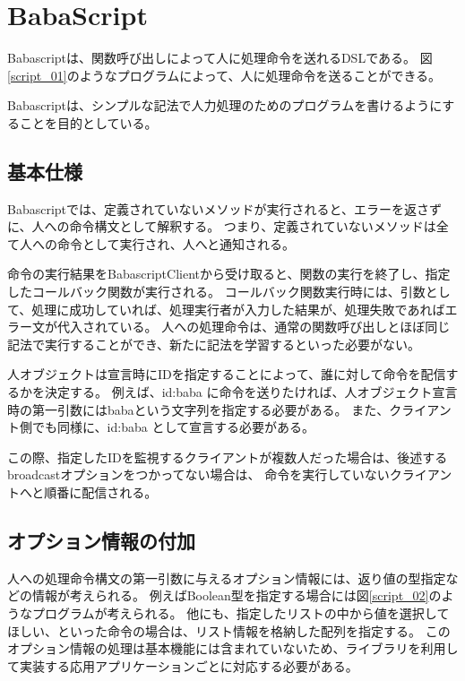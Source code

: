 \documentclass[twoside]{wiss}
\begin{document}
\section{BabaScript}

Babascriptは、関数呼び出しによって人に処理命令を送れるDSLである。
図\ref{script_01}のようなプログラムによって、人に処理命令を送ることができる。

Babascriptは、シンプルな記法で人力処理のためのプログラムを書けるようにすることを目的としている。

\subsection{基本仕様}

Babascriptでは、定義されていないメソッドが実行されると、エラーを返さずに、人への命令構文として解釈する。
つまり、定義されていないメソッドは全て人への命令として実行され、人へと通知される。

命令の実行結果をBabascriptClientから受け取ると、関数の実行を終了し、指定したコールバック関数が実行される。
コールバック関数実行時には、引数として、処理に成功していれば、処理実行者が入力した結果が、処理失敗であればエラー文が代入されている。
人への処理命令は、通常の関数呼び出しとほぼ同じ記法で実行することができ、新たに記法を学習するといった必要がない。

人オブジェクトは宣言時にIDを指定することによって、誰に対して命令を配信するかを決定する。
例えば、id:baba に命令を送りたければ、人オブジェクト宣言時の第一引数にはbabaという文字列を指定する必要がある。
また、クライアント側でも同様に、id:baba として宣言する必要がある。

この際、指定したIDを監視するクライアントが複数人だった場合は、後述するbroadcastオプションをつかってない場合は、
命令を実行していないクライアントへと順番に配信される。

\subsection{オプション情報の付加}

人への処理命令構文の第一引数に与えるオプション情報には、返り値の型指定などの情報が考えられる。
例えばBoolean型を指定する場合には図\ref{script_02}のようなプログラムが考えられる。
他にも、指定したリストの中から値を選択してほしい、といった命令の場合は、リスト情報を格納した配列を指定する。
このオプション情報の処理は基本機能には含まれていないため、ライブラリを利用して実装する応用アプリケーションごとに対応する必要がある。
\end{document}
